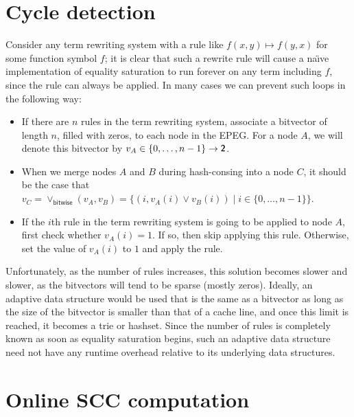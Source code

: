 \documentclass[11pt]{report}
\newcommand{\textbs}[1]{{\sffamily\fontseries{sbc}\selectfont #1}}
\newcommand{\mathbs}[1]{\ensuremath{\text{\textbs{#1}}}}
\newcommand{\mbs}[1]{\ensuremath{\mathbs{#1}}}     %
\newcommand{\msf}[1]{\ensuremath{\mathsf{#1}}}     %
\newcommand{\naive}[0]{{na\"{\i}ve}}
\begin{document}
\section{Cycle detection}
\label{sec:cycle-detection}

Consider any term rewriting system with a rule like $f(x, y) \mapsto f(y, x)$
for some function symbol $f$; it is clear that such a rewrite rule will cause
a \naive{} implementation of equality saturation to run forever on any term
including $f$, since the rule can always be applied. In many cases we can
prevent such loops in the following way:

\begin{itemize}
\item {%
  If there are $n$ rules in the term rewriting system, associate a bitvector of
  length $n$, filled with zeros, to each node in the EPEG. For a node $A$, we
  will denote this bitvector by $v_A \in \{0, \ldots, n - 1\} \to \mbs{2}$.
}
\item {%
  When we merge nodes $A$ and $B$ during hash-consing into a node $C$, it should
  be the case that
  $ v_C
  = {\lor}_\msf{bitwise}(v_A, v_B)
  = \{(i, v_A(i) \lor v_B(i)) \mid i \in \{0, \ldots, n - 1\}\}$.
}
\item {%
  If the $i$th rule in the term rewriting system is going to be applied to
  node $A$, first check whether $v_A(i) = 1$. If so, then skip applying this
  rule. Otherwise, set the value of $v_A(i)$ to $1$ and apply the rule.
}
\end{itemize}

Unfortunately, as the number of rules increases, this solution becomes slower
and slower, as the bitvectors will tend to be sparse (mostly zeros). Ideally,
an adaptive data structure would be used that is the same as a bitvector as
long as the size of the bitvector is smaller than that of a cache line, and once
this limit is reached, it becomes a trie or hashset. Since the number of rules
is completely known as soon as equality saturation begins, such an adaptive data
structure need not have any runtime overhead relative to its underlying data
structures.

\section{Online SCC computation}
\label{sec:online-scc}
\end{document}

